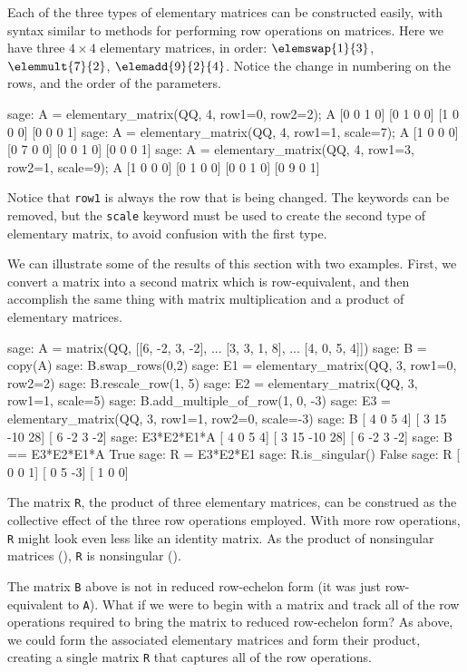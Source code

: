 Each of the three types of elementary matrices can be constructed easily, with syntax similar to methods for performing row operations on matrices.  Here we have three $4\times 4$ elementary matrices, in order: $\elemswap{1}{3}$, $\elemmult{7}{2}$, $\elemadd{9}{2}{4}$.  Notice the change in numbering on the rows, and the order of the parameters.
%
\begin{sageexample}
sage: A = elementary_matrix(QQ, 4, row1=0, row2=2); A
[0 0 1 0]
[0 1 0 0]
[1 0 0 0]
[0 0 0 1]
sage: A = elementary_matrix(QQ, 4, row1=1, scale=7); A
[1 0 0 0]
[0 7 0 0]
[0 0 1 0]
[0 0 0 1]
sage: A = elementary_matrix(QQ, 4, row1=3, row2=1, scale=9); A
[1 0 0 0]
[0 1 0 0]
[0 0 1 0]
[0 9 0 1]
\end{sageexample}
%
Notice that \verb?row1? is always the row that is being changed.  The keywords can be removed, but the \verb?scale? keyword must be used to create the second type of elementary matrix, to avoid confusion with the first type.\par
%
We can illustrate some of the results of this section with two examples.  First, we convert a matrix into a second matrix which is row-equivalent, and then accomplish the same thing with matrix multiplication and a product of elementary matrices.
%
\begin{sageexample}
sage: A = matrix(QQ, [[6, -2, 3, -2],
...                   [3,  3, 1,  8],
...                   [4,  0, 5,  4]])
sage: B = copy(A)
sage: B.swap_rows(0,2)
sage: E1 = elementary_matrix(QQ, 3, row1=0, row2=2)
sage: B.rescale_row(1, 5)
sage: E2 = elementary_matrix(QQ, 3, row1=1, scale=5)
sage: B.add_multiple_of_row(1, 0, -3)
sage: E3 = elementary_matrix(QQ, 3, row1=1, row2=0, scale=-3)
sage: B
[  4   0   5   4]
[  3  15 -10  28]
[  6  -2   3  -2]
sage: E3*E2*E1*A
[  4   0   5   4]
[  3  15 -10  28]
[  6  -2   3  -2]
sage: B == E3*E2*E1*A
True
sage: R = E3*E2*E1
sage: R.is_singular()
False
sage: R
[ 0  0  1]
[ 0  5 -3]
[ 1  0  0]
\end{sageexample}
%
The matrix \verb?R?, the product of three elementary matrices, can be construed as the collective effect of the three row operations employed.  With more row operations, \verb?R? might look even less like an identity matrix.  As the product of nonsingular matrices (), \verb?R? is nonsingular ().\par
%
The matrix \verb?B? above is not in reduced row-echelon form (it was just row-equivalent to \verb?A?).  What if we were to begin with a matrix and track all of the row operations required to bring the matrix to reduced row-echelon form?  As above, we could form the associated elementary matrices and form their product, creating a single matrix \verb?R? that captures all of the row operations.\par
